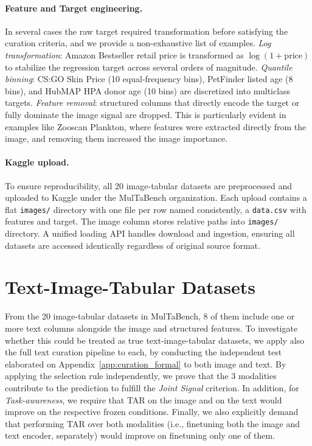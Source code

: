 \documentclass{llmxive}
\begin{document}
\paragraph{Feature and Target engineering.}
In several cases the raw target required transformation before satisfying the curation criteria, and we provide a non-exhaustive list of examples. \textit{Log transformation}: Amazon Bestseller retail price is transformed as $\log(1 + \mathrm{price})$ to stabilize the regression target across several orders of magnitude. \textit{Quantile binning}: CS:GO Skin Price (10 equal-frequency bins), PetFinder listed age (8 bins), and HubMAP HPA donor age (10 bins) are discretized into multiclass targets. \textit{Feature removal}: structured columns that directly encode the target or fully dominate the image signal are dropped. This is particularly evident in examples like Zooscan Plankton, where features were extracted directly from the image, and removing them increased the image importance.

\paragraph{Kaggle upload.}
To ensure reproducibility, all 20 image-tabular datasets are preprocessed and uploaded to Kaggle under the MulTaBench organization. Each upload contains a flat \texttt{images/} directory with one file per row named consistently, a \texttt{data.csv} with features and target. The image column stores relative paths into \texttt{images/} directory. A unified loading API handles download and ingestion, ensuring all datasets are accessed identically regardless of original source format.


\section{Text-Image-Tabular Datasets}
\label{app:trimodal_datasets}

From the 20 image-tabular datasets in MulTaBench, 8 of them include one or more text columns alongside the image and structured features. To investigate whether this could be treated as true text-image-tabular datasets, we apply also the full text curation pipeline to each, by conducting the independent test elaborated on Appendix~\ref{app:curation_formal} to both image and text. By applying the selection rule independently, we prove that the 3 modalities contribute to the prediction to fulfill the \textit{Joint Signal} criterion. In addition, for \textit{Task-awareness}, we require that TAR on the image and on the text would improve on the respective frozen conditions. Finally, we also explicitly demand that performing TAR over both modalities (i.e., finetuning both the image and text encoder, separately) would improve on finetuning only one of them.
\end{document}
